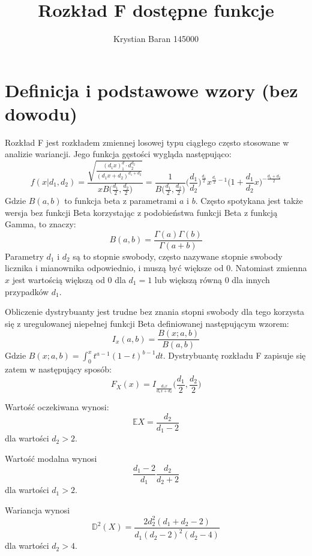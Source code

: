 \documentclass{article}
\author{Krystian Baran 145000}
\title{Rozkład F dostępne funkcje}
\begin{document}
\maketitle
\newpage

\tableofcontents

\newpage

\section{Definicja i podstawowe wzory (bez dowodu)}
Rozkład F jest rozkładem zmiennej losowej typu ciągłego często stosowane w analizie wariancji. Jego funkcja gęstości wygląda następująco:
\[
f(x|d_1,d_2) = \frac{\sqrt{ \frac{(d_1x)^d_1\cdot d_2^{d_2}}{(d_1x+d_2)^{d_1+d_2} }}}{x B\big( \frac{d_1}{2}, \frac{d_2}{2} \big)} =
\frac{1}{ B\big( \frac{d_1}{2}, \frac{d_2}{2} \big)} \Big( \frac{d_1}{d_2}\Big)^{\frac{d_1}{2}} x^{\frac{d_1}{2}-1} \Big(1 + \frac{d_1}{d_2}x \Big)^{-\frac{d_1+d_2}{2}}
\]
Gdzie $B(a,b)$ to funkcja beta z parametrami $a$ i $b$. Często spotykana jest także wersja bez funkcji Beta korzystając z podobieństwa funkcji Beta z funkcją Gamma, to znaczy:
\[
B(a,b) = \frac{\Gamma(a)\Gamma(b)}{\Gamma(a+b)}
\]
Parametry $d_1$ i $d_2$ są to stopnie swobody, często nazywane stopnie swobody licznika i mianownika odpowiednio, i muszą być większe od 0. Natomiast zmienna $x$ jest wartością większą od 0 dla $d_1 = 1$ lub większą równą 0 dla innych przypadków $d_1$. \\ \par
Obliczenie dystrybuanty jest trudne bez znania stopni swobody dla tego korzysta się z uregulowanej niepełnej funkcji Beta definiowanej następującym wzorem:
\[
I_x(a,b) = \frac{B(x;a,b)}{B(a,b)}
\]
Gdzie $B(x;a,b) = \int_0^x t^{a-1}(1-t)^{b-1}dt$.
Dystrybuantę rozkładu F zapisuje się zatem w następujący sposób:
\[
F_X(x) = I_{\frac{d_1x}{d_1x+d_2}} \Big( \frac{d_1}{2}, \frac{d_2}{2} \Big)
\]

Wartość oczekiwana wynosi:
$$\mathbb{E}X = \frac{d_2}{d_1-2}$$ 
dla wartości $d_2 > 2$. \par
Wartość modalna wynosi 
$$\frac{d_1-2}{d_1}\frac{d_2}{d_2+2}$$
dla wartości $d_1 > 2$. \par
Wariancja wynosi 
$$\mathbb{D}^2(X) = \frac{2d_2^2(d_1+d_2-2)}{d_1(d_2-2)^2(d_2-4)}$$
dla wartości $d_2 > 4$.

\newpage
\end{document}
